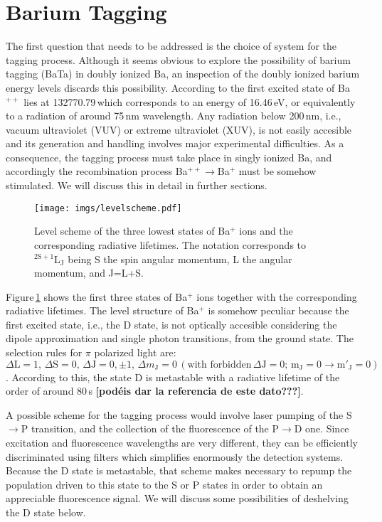 

\section{Barium Tagging}\label{BaTa}

The first question that needs to be addressed is the choice of system for the tagging process. Although it seems obvious to explore the possibility of barium tagging (BaTa) in doubly ionized Ba, an inspection of the doubly ionized barium energy levels discards this possibility.  According to \cite{Sansonetti10} the first excited state of Ba$^{++}$ lies at 132770.79\,\waven which corresponds to an energy of 16.46\,eV, or equivalently to a radiation of around 75\,nm wavelength. Any radiation below 200\,nm, i.e., vacuum ultraviolet (VUV) or extreme ultraviolet (XUV), is not easily accesible and its generation and handling involves major experimental difficulties. As a consequence, the tagging process must take place in singly ionized Ba, and accordingly the recombination process Ba$^{++}\rightarrow$Ba$^{+}$ must be somehow stimulated. We will discuss this in detail in further sections. 

\begin{figure}[ht!]
\begin{center}
\texttt{[image: imgs/levelscheme.pdf]}
\caption{\label{levelscheme} Level scheme of the three lowest states of Ba$^+$ ions and the corresponding radiative lifetimes. The notation corresponds to $^{2\mathrm{S}+1}\mathrm{L}_\mathrm{J}$ being S the spin angular momentum, L the angular momentum, and J=L+S.}
\end{center}
\end{figure}

Figure\,\ref{levelscheme} shows the first three states of Ba$^+$ ions together with the corresponding radiative lifetimes. The level structure of Ba$^+$ is somehow peculiar because the first excited state, i.e., the D state, is not optically accesible considering the dipole approximation and single photon transitions, from the ground state.  The selection rules for $\pi$ polarized light are: $ \Delta\mathrm{L}=1, \,\Delta\mathrm{S}=0, \,\Delta\mathrm{J}=0,\pm1, \,\Delta m_\mathrm{J}=0\,(\text{with forbidden}\, \Delta\mathrm{J}=0;\,\mathrm{m_J}=0\rightarrow\mathrm{m'_J}=0)$.  According to this, the state D is metastable with a radiative lifetime of the order of around 80\,s \textbf{[pod\'eis dar la referencia de este dato???]}. 

A possible scheme for the tagging process would involve laser pumping of the S$\rightarrow$P transition, and the collection of the fluorescence of the P$\rightarrow$D one. Since excitation and fluorescence wavelengths are very different, they can be efficiently discriminated using filters which simplifies enormously the detection systems. Because the D state is metastable, that scheme makes necessary to repump the population driven to this state to the S or P states in order to obtain an appreciable fluorescence signal.  We will discuss some possibilities of deshelving the D state below. 

